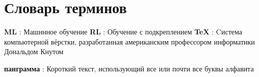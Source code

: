 \chapter*{Словарь терминов}             %
\textbf{ML} : Машинное обучение
\textbf{RL} : Обучение с подкреплением
\textbf{TeX} : Cистема компьютерной вёрстки, разработанная американским профессором информатики Дональдом Кнутом

\textbf{панграмма} : Короткий текст, использующий все или почти все буквы алфавита
